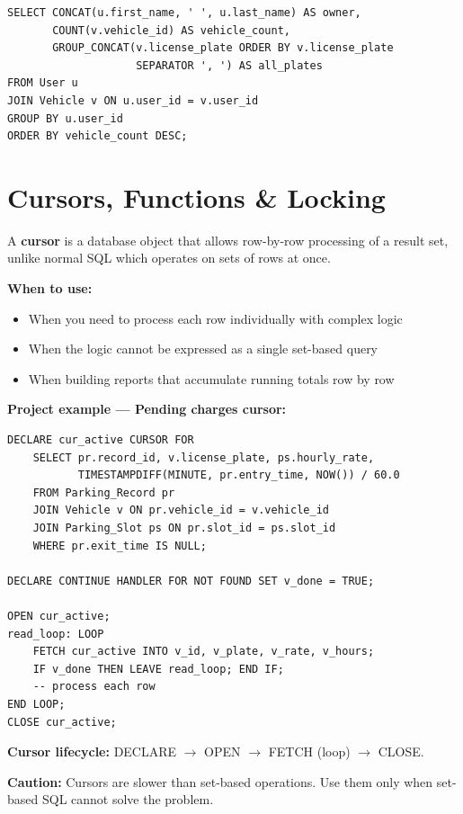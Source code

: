 \documentclass[12pt,a4paper]{article}
\begin{document}
\begin{questionbox}
\end{questionbox}
\begin{answerbox}
\begin{lstlisting}
SELECT CONCAT(u.first_name, ' ', u.last_name) AS owner,
       COUNT(v.vehicle_id) AS vehicle_count,
       GROUP_CONCAT(v.license_plate ORDER BY v.license_plate
                    SEPARATOR ', ') AS all_plates
FROM User u
JOIN Vehicle v ON u.user_id = v.user_id
GROUP BY u.user_id
ORDER BY vehicle_count DESC;
\end{lstlisting}
\end{answerbox}

\section{Cursors, Functions \& Locking}

\begin{questionbox}
\end{questionbox}
\begin{answerbox}
A \textbf{cursor} is a database object that allows row-by-row processing of a result set, unlike normal SQL which operates on sets of rows at once.

\textbf{When to use:}
\begin{itemize}[nosep]
    \item When you need to process each row individually with complex logic
    \item When the logic cannot be expressed as a single set-based query
    \item When building reports that accumulate running totals row by row
\end{itemize}

\textbf{Project example --- Pending charges cursor:}
\begin{lstlisting}
DECLARE cur_active CURSOR FOR
    SELECT pr.record_id, v.license_plate, ps.hourly_rate,
           TIMESTAMPDIFF(MINUTE, pr.entry_time, NOW()) / 60.0
    FROM Parking_Record pr
    JOIN Vehicle v ON pr.vehicle_id = v.vehicle_id
    JOIN Parking_Slot ps ON pr.slot_id = ps.slot_id
    WHERE pr.exit_time IS NULL;

DECLARE CONTINUE HANDLER FOR NOT FOUND SET v_done = TRUE;

OPEN cur_active;
read_loop: LOOP
    FETCH cur_active INTO v_id, v_plate, v_rate, v_hours;
    IF v_done THEN LEAVE read_loop; END IF;
    -- process each row
END LOOP;
CLOSE cur_active;
\end{lstlisting}

\textbf{Cursor lifecycle:} DECLARE $\rightarrow$ OPEN $\rightarrow$ FETCH (loop) $\rightarrow$ CLOSE.

\textbf{Caution:} Cursors are slower than set-based operations. Use them only when set-based SQL cannot solve the problem.
\end{answerbox}
\end{document}
